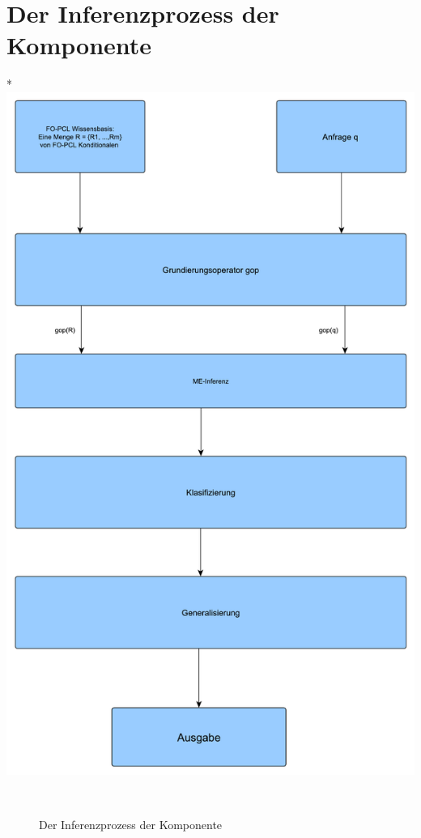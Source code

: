 \documentclass[a4paper, 11pt]{book}
\begin{document}
\section{Der Inferenzprozess der Komponente}
*\includegraphics[scale = 0.4]{Graphics/Inferenzprozess_Komponente}
\begin{figure}[h]
	\caption{Der Inferenzprozess der Komponente }\
\end{figure}
\\
	
\end{document}
